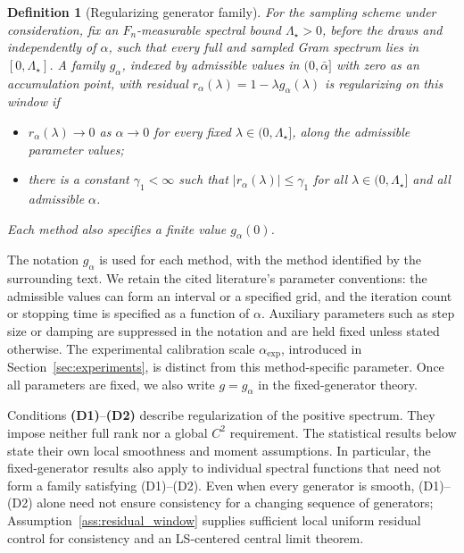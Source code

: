 \documentclass[pdflatex,iicol,sn-mathphys-ay]{sn-jnl}
\theoremstyle{thmstyleone}
\theoremstyle{thmstylethree}
\newtheorem{definition}{Definition}
\theoremstyle{thmstyletwo}
\begin{document}
\begin{definition}[Regularizing generator family]
\label{def:generator}
For the sampling scheme under consideration, fix an $F_n$-measurable
spectral bound $\Lambda_\star>0$, before the draws and independently of $\alpha$, such
that every full and sampled Gram spectrum lies in $[0,\Lambda_\star]$.
A family $g_\alpha$, indexed by admissible values in $(0,\bar\alpha]$
with zero as an accumulation point, with residual
$r_\alpha(\lambda)=1-\lambda g_\alpha(\lambda)$ is regularizing on this
window if
\begin{itemize}
\item[\textbf{(D1)}] $r_\alpha(\lambda)\to0$ as $\alpha\to0$ for every
fixed $\lambda\in(0,\Lambda_\star]$, along the admissible parameter values;
\item[\textbf{(D2)}] there is a constant $\gamma_1<\infty$ such that
$|r_\alpha(\lambda)|\le\gamma_1$ for all
$\lambda\in(0,\Lambda_\star]$ and all admissible $\alpha$.
\end{itemize}
Each method also specifies a finite value $g_\alpha(0)$.
\end{definition}

The notation $g_\alpha$ is used for each method, with the method identified by the surrounding text. We retain the cited literature's parameter conventions: the admissible values can form an interval or a specified grid, and the iteration count or stopping time is specified as a function of $\alpha$. Auxiliary parameters such as step size or damping are suppressed in the notation and are held fixed unless stated otherwise. The experimental calibration scale $\alpha_{\mathrm{exp}}$, introduced in Section~\ref{sec:experiments}, is distinct from this method-specific parameter. Once all parameters are fixed, we also write $g=g_\alpha$ in the fixed-generator theory.

\noindent Conditions \textbf{(D1)}--\textbf{(D2)} describe regularization
of the positive spectrum. They impose neither full rank nor a global
$C^2$ requirement. The statistical results below state their own local
smoothness and moment assumptions. In particular, the fixed-generator
results also apply to individual spectral functions that need not form
a family satisfying (D1)--(D2). Even when every generator is smooth,
(D1)--(D2) alone need not ensure consistency for a changing sequence of
generators; Assumption~\ref{ass:residual_window} supplies sufficient local
uniform residual control for consistency and an LS-centered central limit theorem.
\end{document}
